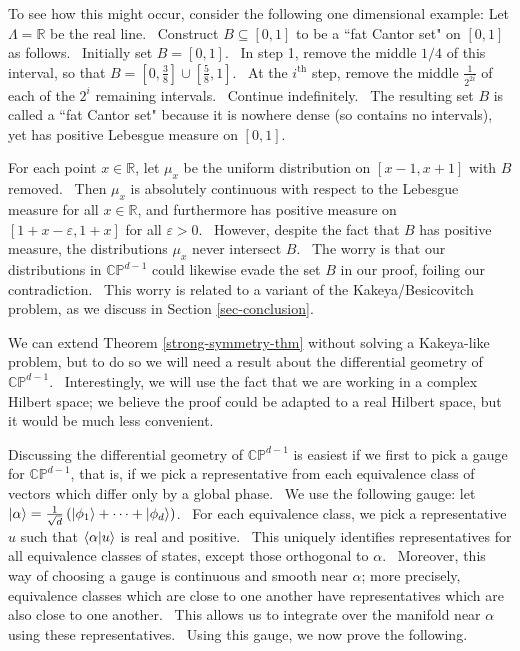 \documentclass[letterpaper,12pt]{article}
\newcommand{\braket}[2]{\mbox{$ \langle #1 | #2 \rangle $}}
\newcommand{\ket}[1]{\mbox{$ | #1 \rangle $}}
\begin{document}
To see how this might occur, consider the following one dimensional example: Let $\Lambda = \mathbb{R}$ be the real line. \ Construct $B\subseteq [0,1]$ to be a ``fat Cantor set" on $[0,1]$ as follows. \ Initially set $B=[0,1]$. \ In step 1, remove the middle $1/4$ of this interval, so that $B=[0,\frac{3}{8}]\cup[\frac{5}{8},1]$. \ At the $i^{\mathrm{th}}$ step, remove the middle $\frac{1}{2^{2i}}$ of each of the $2^i$ remaining intervals. \ Continue indefinitely. \ The resulting set $B$ is called a ``fat Cantor set" because it is nowhere dense (so contains no intervals), yet has positive Lebesgue measure on $[0,1]$.


For each point $x\in \mathbb{R}$, let $\mu_x$ be the uniform distribution on $[x-1,x+1]$ with $B$ removed. \ Then $\mu_x$ is absolutely continuous with respect to the Lebesgue measure for all $x\in \mathbb{R}$, and furthermore has positive measure on $[1+x-\varepsilon, 1+x]$ for all $\varepsilon>0$. \ However, despite the fact that $B$ has positive measure, the distributions $\mu_x$ never intersect $B$. \ The worry is that our distributions in $\mathbb{CP}^{d-1}$ could likewise evade the set $B$ in our proof, foiling our contradiction. \ This worry is related to a variant of the Kakeya/Besicovitch problem, as we discuss in Section \ref{sec-conclusion}.

We can extend Theorem \ref{strong-symmetry-thm} without solving a Kakeya-like problem, but to do so we will need a result about the differential geometry of $\mathbb{CP}^{d-1}$. \ Interestingly, we will use the fact that we are working in a complex Hilbert space; we believe the proof could be adapted to a real Hilbert space, but it would be much less convenient.

Discussing the differential geometry of $\mathbb{CP}^{d-1}$ is easiest if we first to pick a gauge for $\mathbb{CP}^{d-1}$, that is, if we pick a representative from each equivalence class of vectors which differ only by a global phase. \ We use the following gauge: let $\ket{\alpha}=\frac{1}{\sqrt{d}}\left(\ket{\phi_1}+\cdots +\ket{\phi_d}\right)$. \ For each equivalence class, we pick a representative $u$ such that $\braket{\alpha}{u}$ is real and positive. \ This uniquely identifies representatives for all equivalence classes of states, except those orthogonal to $\alpha$. \ Moreover, this way of choosing a gauge is continuous and smooth near $\alpha$; more precisely, equivalence classes which are close to one another have representatives which are also close to one another. \ This allows us to integrate over the manifold near $\alpha$ using these representatives. \ Using this gauge, we now prove the following.
\end{document}
